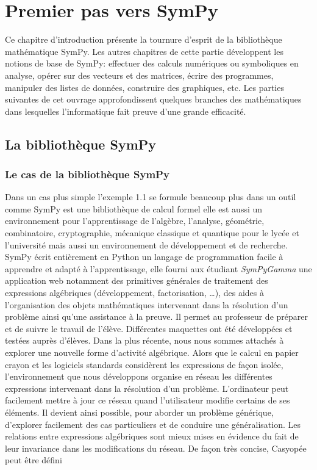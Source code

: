 \chapter{Premier pas vers SymPy}

Ce chapitre d’introduction présente la tournure d’esprit de la bibliothèque mathématique SymPy. Les 
autres chapitres de cette partie développent les notions de base de SymPy: effectuer des calculs 
numériques ou symboliques en analyse, opérer sur des vecteurs et des matrices, écrire des programmes, 
manipuler des listes de données, construire des graphiques, etc. Les parties suivantes de cet ouvrage 
approfondissent quelques branches des mathématiques dans lesquelles l’informatique fait preuve d’une 
grande efficacité.

\section{La bibliothèque SymPy}

\subsection{Le cas de la bibliothèque SymPy}

Dans un cas plus simple l'exemple 1.1 se formule beaucoup plus dans un outil comme SymPy est une bibliothèque de calcul formel elle est aussi un environnement pour 
l’apprentissage de l’algèbre, l’analyse, géométrie, combinatoire, cryptographie, mécanique 
classique et quantique pour le lycée et l’université mais aussi un environnement de 
développement et de recherche. SymPy  écrit entièrement en Python un langage de 
programmation facile à apprendre et adapté à l’apprentissage,  elle fourni aux étudiant 
\textit{SymPyGamma} une application web   notamment des primitives générales de traitement des 
expressions algébriques (développement, factorisation, …), des aides à l’organisation des objets 
mathématiques intervenant dans la résolution d’un problème ainsi qu’une assistance à la preuve. Il 
permet au professeur de préparer et de suivre le travail de l’élève. Différentes maquettes ont été 
développées et testées auprès d’élèves. Dans la plus récente, nous nous sommes attachés à explorer une 
nouvelle forme d’activité algébrique. Alors que le calcul en papier crayon et les logiciels standards 
considèrent  les expressions de façon isolée, l’environnement que nous développons organise en réseau 
les différentes expressions intervenant dans la résolution d’un problème. L’ordinateur peut facilement 
mettre à jour ce réseau quand l’utilisateur modifie certains de ses éléments. Il devient ainsi possible, 
pour aborder un problème générique, d’explorer facilement des cas particuliers et de conduire une 
généralisation. Les relations entre expressions algébriques sont mieux mises en évidence du fait de leur 
invariance dans les modifications du réseau. De façon très concise, Casyopée peut être défini
